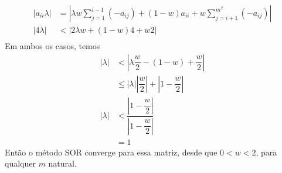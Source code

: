 \documentclass{article}
\begin{document}
\begin{enumerate}
\begin{enumerate}
                \begin{align*}
                    |a_{ii} \lambda| &= \left|\lambda w \sum_{j=1}^{i-1} (-a_{ij}) + (1-w)a_{ii} + w \sum_{j=i+1}^{m^2} (-a_{ij})\right| \\
                    |4 \lambda| &< \left|2\lambda w + (1-w)4 + w 2\right| \\
                \end{align*}
                Em ambos os casos, temos
                \begin{align*}
                    |\lambda| &< \left|\lambda \dfrac{w}{2} - (1-w) + \dfrac{w}{2} \right| \\
                    & \le |\lambda| \left|\dfrac{w}{2}\right| + \left|1 - \dfrac{w}{2}\right| \\
                    |\lambda| &< \dfrac{\left|1 - \dfrac{w}{2}\right|}{\left|1 - \dfrac{w}{2}\right|} \\
                    &= 1
                \end{align*}
                Então o método SOR converge para essa matriz, desde que $0 < w < 2$, para qualquer $m$ natural.
        \end{enumerate}
    \end{enumerate}

    

\end{document}
